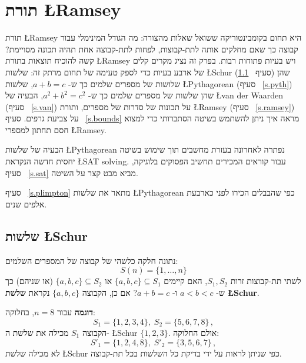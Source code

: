 

\chapter{תורת \L{Ramsey}}\label{c.ramsey}

תורת 
\L{Ramsey}
היא תחום בקומבינטוריקה ששואל שאלות מהצורה: מה הגודל המינימלי עבור קבוצה כך שאם מחלקים אותה לתת-קבוצות, לפחות לתת-קבוצה אחת תהיה תכונה מסויימת? קשה להוכיח תוצאות בתורת 
\L{Ramsey}
ויש בעיות פתוחות רבות. בפרק זה נציג מקרים קלים של ארבע בעיות כדי לספק טעימה של תחום מרתק זה: שלשות
\L{Schur}
(סעיף%
~\ref{s.schur})
שהן שלושות של מספרים שלמים כך ש-%
$a+b=c$,
שלשות
\L{Pythagorean}
(סעיף%
~\ref{s.pyth})
שהן שלשות של מספרים שלמים כך ש-%
$a^2+b^2=c^2$,
הבעיה של
\L{van der Waarden}
(סעיף%
~\ref{s.van})
על תכונות של סדרות של מספרים, ותורת
\L{Ramsey}
(סעיף%
~\ref{s.ramsey})
על צביעת גרפים. סעיף%
~\ref{s.bounds}
מראה איך ניתן להשתמש בשיטה הסתברותי כדי למצוא חסם תחתון למספרי
\L{Ramsey}.

הבעיה של שלשות
\L{Pythagorean}
נפתרה לאחרונה בעזרת מחשבים תוך שימוש בשיטה יחסית חדשה הנקראת 
\L{SAT solving}.
עבור קוראים המכירים תחשיב הפסוקים בלוגיקה, סעיף%
~\ref{s.sat}
מביא מבט קצר על השיטה.

סעיף%
~\ref{s.plimpton}
מתאר את שלשות 
\L{Pythagorean}
כפי שהבבלים הכירו לפני כארבעת אלפים שנים.


\section{שלשות \L{Schur}}\label{s.schur}

\begin{definition}
נתונה חלקה כלשהי של קבוצה של המספרים השלמים:
\[
S(n)=\{1,\ldots,n\}
\]
לשתי תת-קבוצות זרות
$S_1,S_2$,
האם קיימים
$\{a,b,c\}\subseteq S_1$
או
$\{a,b,c\}\subseteq S_2$
(או שניהם) כך ש-%
$a\!<\!b\!<\!c$
ו-%
$a+b=c$?
אם כן, הקבוצה 
$\{a,b,c\}$
נקראת 
\textbf{שלשת \L{Schur}}.
\end{definition}

\textbf{דוגמה}
עבור
$n=8$,
בחלוקה:
\[
S_1 = \{1,2,3,4\},\; S_2 = \{5,6,7,8\}\,,
\label{eq.schur0}
\]
הקבוצה
$S_1$
מכילה את שלשת ה-%
\L{Schur}
$\{1,2,3\}$.
אולם החלוקה:
\[
S'_1 = \{1,2,4,8\},\; S'_2 = \{3,5,6,7\}\,,
\label{eq:schur1}
\]
לא מכילה שלשת
\L{Schur}
כפי שניתן לראות על ידי בדיקת כל השלשות בכל תת-קבוצה.

